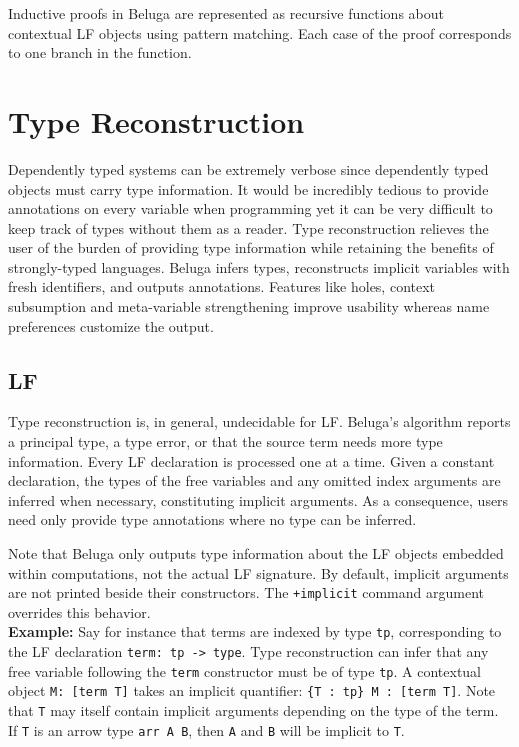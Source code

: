 \documentclass[11pt]{article}
\begin{document}
Inductive proofs in Beluga are represented as recursive functions about contextual LF objects using pattern matching. Each case of the proof corresponds to one branch in the function.
   


\section{Type Reconstruction}
Dependently typed systems can be extremely verbose since dependently typed objects must carry type information. It would be incredibly tedious to provide annotations on every variable when programming yet it can be very difficult to keep track of types without them as a reader. Type reconstruction relieves the user of the burden of providing type information while retaining the benefits of strongly-typed languages. Beluga infers types, reconstructs implicit variables with fresh identifiers, and outputs annotations. Features like holes, context subsumption and meta-variable strengthening improve usability whereas name preferences customize the output.

\subsection{LF}
Type reconstruction is, in general, undecidable for LF. Beluga's algorithm reports a principal type, a type error, or that the source term needs more type information. Every LF declaration is processed one at a time. Given a constant declaration, the types of the free variables and any omitted index arguments are inferred when necessary, constituting implicit arguments. As a consequence, users need only provide type annotations where no type can be inferred.

Note that Beluga only outputs type information about the LF objects embedded within computations, not the actual LF signature. By default, implicit arguments are not printed beside their constructors. The \texttt{+implicit} command argument overrides this behavior. \\

\textbf{Example:} Say for instance that terms are indexed by type \texttt{tp}, corresponding to the LF declaration \texttt{term: tp -> type}. Type reconstruction can infer that any free variable following the \texttt{term} constructor must be of type \texttt{tp}. A contextual object \texttt{M: [term T]} takes an implicit quantifier: \texttt{\{T : tp\} M : [term T]}. Note that \texttt{T} may itself contain implicit arguments depending on the type of the term. If \texttt{T} is an arrow type \texttt{arr A B}, then \texttt{A} and \texttt{B} will be implicit to \texttt{T}.
\end{document}
